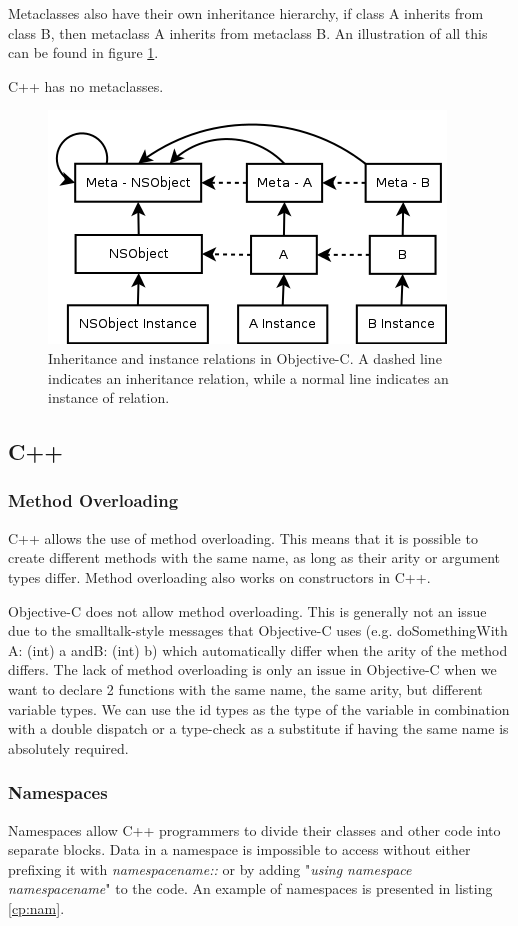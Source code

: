 \documentclass[12pt, a4paper, twocolumn]{article}
\begin{document}
Metaclasses also have their own inheritance hierarchy, if class A inherits from class B, then metaclass A inherits from metaclass B. An illustration of all this can be found in figure \ref{fig:meta}.

C++ has no metaclasses.

\begin{figure}[h]
\centerline{
\includegraphics[scale=0.5]{files/meta.png}}
\caption{Inheritance and instance relations in Objective-C. A dashed line indicates an inheritance relation, while a normal line indicates an instance of relation.}
\label{fig:meta}
\end{figure}

\subsection{C++}
\subsubsection{Method Overloading}
\label{sec:overloading}
C++ allows the use of method overloading. This means that it is possible to create different methods with the same name, as long as their arity or argument types differ. Method overloading also works on constructors in C++.

Objective-C does not allow method overloading. This is generally not an issue due to the smalltalk-style messages that Objective-C uses (e.g. doSomethingWith A: (int) a andB: (int) b) which automatically differ when the arity of the method differs. The lack of method overloading is only an issue in Objective-C when we want to declare 2 functions with the same name, the same arity, but different variable types. We can use the id types as the type of the variable in combination with a double dispatch or a type-check as a substitute if having the same name is absolutely required.

\subsubsection{Namespaces}
\label{sec:namespaces}
Namespaces allow C++ programmers to divide their classes and other code into separate blocks. Data in a namespace is impossible to access without either prefixing it with \textit{namespacename::} or by adding "\textit{using namespace namespacename}" to the code. An example of namespaces is presented in listing \ref{cp:nam}.
\end{document}
